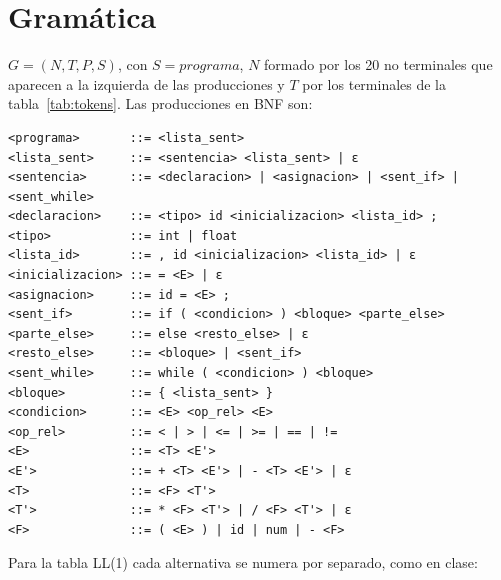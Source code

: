 \documentclass[12pt]{article}
\newcommand{\nt}[1]{\textit{#1}}
\begin{document}
\section{Gramática}
\label{sec:gramatica}

$G = (N, T, P, S)$, con $S = \nt{programa}$, $N$ formado por los 20 no terminales que aparecen a
la izquierda de las producciones y $T$ por los terminales de la tabla~\ref{tab:tokens}. Las
producciones en BNF son:

\begin{lstlisting}
<programa>       ::= <lista_sent>
<lista_sent>     ::= <sentencia> <lista_sent> | ε
<sentencia>      ::= <declaracion> | <asignacion> | <sent_if> | <sent_while>
<declaracion>    ::= <tipo> id <inicializacion> <lista_id> ;
<tipo>           ::= int | float
<lista_id>       ::= , id <inicializacion> <lista_id> | ε
<inicializacion> ::= = <E> | ε
<asignacion>     ::= id = <E> ;
<sent_if>        ::= if ( <condicion> ) <bloque> <parte_else>
<parte_else>     ::= else <resto_else> | ε
<resto_else>     ::= <bloque> | <sent_if>
<sent_while>     ::= while ( <condicion> ) <bloque>
<bloque>         ::= { <lista_sent> }
<condicion>      ::= <E> <op_rel> <E>
<op_rel>         ::= < | > | <= | >= | == | !=
<E>              ::= <T> <E'>
<E'>             ::= + <T> <E'> | - <T> <E'> | ε
<T>              ::= <F> <T'>
<T'>             ::= * <F> <T'> | / <F> <T'> | ε
<F>              ::= ( <E> ) | id | num | - <F>
\end{lstlisting}

Para la tabla LL(1) cada alternativa se numera por separado, como en clase:
\end{document}
